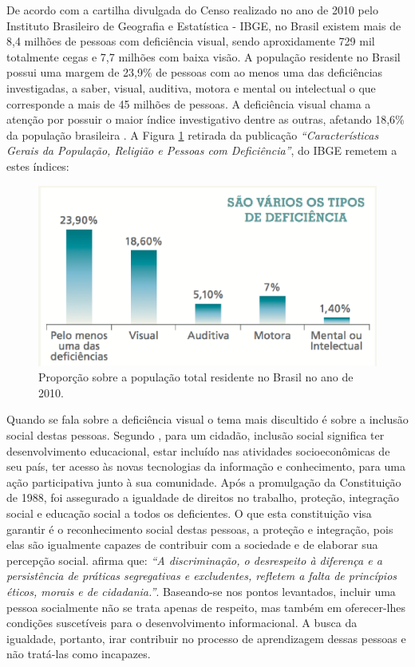 De acordo com a cartilha divulgada do Censo realizado no ano de 2010 pelo Instituto Brasileiro de Geografia e Estatística - IBGE, no Brasil existem mais de 8,4 milhões de pessoas com deficiência visual, sendo aproxidamente 729 mil totalmente cegas e 7,7 milhões com baixa visão. A população residente no Brasil possui uma margem de 23,9\% de pessoas com ao menos uma das deficiências investigadas, a saber, visual, auditiva, motora e mental ou intelectual o que corresponde a mais de 45 milhões de pessoas. A deficiência visual chama a atenção por possuir o maior índice investigativo dentre as outras, afetando 18,6\% da população brasileira \cite{cartilha}. A Figura \ref{censo2010} retirada da publicação \textit{``Características Gerais da População, Religião e Pessoas com Deficiência''}, do IBGE remetem a estes índices:

 \begin{figure}[ht]
	\centering
		\includegraphics[keepaspectratio=true,scale=0.9]{figuras/censo2010.eps}
	\caption{Proporção sobre a população total residente no Brasil no ano de 2010.}
	\label{censo2010}
\end{figure}

Quando se fala sobre a deficiência visual o tema mais discultido é sobre a inclusão social destas pessoas. Segundo \cite{patricia}, para um cidadão, inclusão social significa ter desenvolvimento educacional, estar incluído nas atividades socioeconômicas de seu país, ter acesso às novas tecnologias da informação e conhecimento, para uma ação participativa junto à sua comunidade. Após a promulgação da Constituição de 1988, foi assegurado a igualdade de direitos no trabalho, proteção, integração social e educação social a todos os deficientes. O que esta constituição visa garantir é o reconhecimento social destas pessoas, a proteção e integração, pois elas são igualmente capazes de contribuir com a sociedade e de elaborar sua percepção social. \cite{matos} afirma que: \textit{``A discriminação, o desrespeito à diferença e a persistência de práticas segregativas e excludentes, refletem a falta de princípios éticos, morais e de cidadania.''}. Baseando-se nos pontos levantados, incluir uma pessoa socialmente não se trata apenas de respeito, mas também em oferecer-lhes condições suscetíveis para o desenvolvimento informacional. A busca da igualdade, portanto, irar contribuir no processo de aprendizagem dessas pessoas e não tratá-las como incapazes. 

